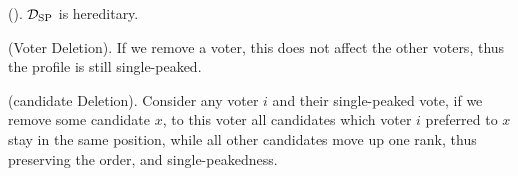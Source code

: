\begin{proposition}{\textnormal{(\citet{elkindPreferenceRestrictionsComputational2022}).}}
	$\mathcal{D}_{\textnormal{SP}}$ is hereditary.
\end{proposition}

\begin{proofc}
	(Voter Deletion). If we remove a voter, this does not affect the other voters, thus the profile is still single-peaked.~\checkmark

	(candidate Deletion). Consider any voter $i$ and their single-peaked vote, if we remove some candidate $x$, to this voter all candidates which voter $i$ preferred to $x$ stay in the same position, while all other candidates move up one rank, thus preserving the order, and single-peakedness.~\checkmark
\end{proofc}


%
%
%
%
%

